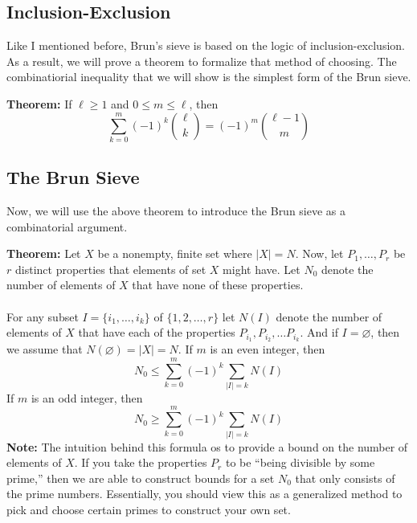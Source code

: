 \documentclass[8pt]{extarticle}
\begin{document}
\subsection{Inclusion-Exclusion}
Like I mentioned before, Brun's sieve is based on the logic of inclusion-exclusion. As a result, we will prove a theorem to formalize that method of choosing. The combinatiorial inequality that we will show is the simplest form of the Brun sieve.
\begin{boxedsection}
\textbf{Theorem:} If $\ell \geq 1$ and $0 \leq m \leq \ell$, then
$$
\sum_{k=0}^m (-1)^k {\ell \choose k}  = (-1)^m {\ell - 1 \choose m}
$$
\end{boxedsection}
\subsection{The Brun Sieve}
Now, we will use the above theorem to introduce the Brun sieve as a combinatorial argument.
\begin{boxedsection}
\textbf{Theorem:} Let $X$ be a nonempty, finite set where $|X| = N$. Now, let $P_1, \dots, P_r$ be $r$ distinct properties that elements of set $X$ might have. Let $N_0$ denote the number of elements of $X$ that have none of these properties. \\
\\
For any subset $I = \{i_1, \dots, i_k\}$ of $\{1,2,\dots, r\}$ let $N(I)$ denote the number of elements of $X$ that have each of the properties $P_{i_1}, P_{i_2}, \dots P_{i_k}$. And if $I = \varnothing$, then we assume that $N(\varnothing) = |X| = N$. If $m$ is an even integer, then
$$
N_0 \leq \sum_{k=0}^m (-1)^k \sum_{|I| = k} N(I)
$$
If $m$ is an odd integer, then 
$$
N_0 \geq \sum_{k=0}^m (-1)^k \sum_{|I| = k} N(I)
$$
\textbf{Note:} The intuition behind this formula os to provide a bound on the number of elements of $X$. If you take the properties $P_r$ to be ``being divisible by some prime,'' then we are able to construct bounds for a set $N_0$ that only consists of the prime numbers. Essentially, you should view this as a generalized method to pick and choose certain primes to construct your own set.
\end{boxedsection}
\end{document}
